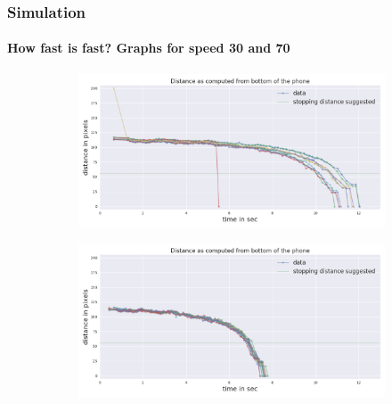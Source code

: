 \documentclass[dvipsnames,svgnames]{beamer}
\begin{document}
\begin{frame}
\frametitle{Simulation}
\framesubtitle{How fast is fast? Graphs for speed 30 and 70 }

\begin{figure}[ht]
        \centering
        \captionsetup{justification=centering,margin=2cm}
        \begin{subfigure}[b]{0.7\textwidth}
            \centering
            \includegraphics[width=\textwidth]{img/distances_30.png}   
        \end{subfigure}
        
        
        \begin{subfigure}[b]{0.7\textwidth}  
            \centering 
            \includegraphics[width=\textwidth]{img/distances_70.png}
        \end{subfigure}
\end{figure}

\end{frame}
\end{document}
